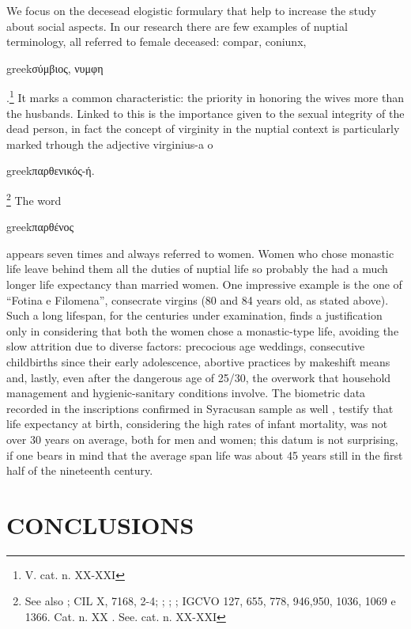 \documentclass[amsthm,ebook]{saparticle}
\begin{document}
We focus on the decesead elogistic formulary that help to increase the study about social aspects. In our research there are few examples of nuptial terminology, all referred to female deceased: compar, coniunx, 
\begin{otherlanguage*}{greek}σύμβιος, νυμφη\end{otherlanguage*}
.\footnote{V. cat. n. XX-XXI} It marks a common characteristic: the priority in honoring the wives more than the husbands. Linked to this is the importance given to the sexual integrity of the dead person, in fact the concept of virginity in the nuptial context is particularly marked trhough the adjective virginius-a o \begin{otherlanguage*}{greek}παρθενικός-ή.\end{otherlanguage*}
\footnote{See also \citet[129-130]{SGARLATA1991} \citet[493]{CARINI 1887}; CIL X, 7168, 2-4; \citet[5, 22, 44]{ORSI1893}; \citet[6, 7]{FUHRER1897}; \citep[21/29, 38, 39, 43, 45, 48, 58, 60, 69]{FERRUA1983}; IGCVO 127, 655, 778, 946,950, 1036, 1069 e 1366. Cat. n. XX \citep[214]{ORSI1896}. See. cat. n. XX-XXI} The word \begin{otherlanguage*}{greek}παρθένος\end{otherlanguage*} 
appears seven times and always referred to women. Women who chose monastic life leave behind them all the duties of nuptial life so probably the had a much longer life expectancy than married women. One impressive example is the one of ``Fotina e Filomena'', consecrate virgins (80 and 84 years old, as stated above). Such a long lifespan, for the centuries under examination, finds a justification only in considering that both the women chose a monastic-type life, avoiding the slow attrition due to diverse factors: precocious age weddings, consecutive childbirths since their early adolescence, abortive practices by makeshift means and, lastly, even after the dangerous age of 25/30, the overwork that household management and hygienic-sanitary conditions involve. The biometric data recorded in the inscriptions confirmed in Syracusan sample as well \citep{SGARLATA1991}, testify that life expectancy at birth, considering the high rates of infant mortality, was not over 30 years on average, both for men and women; this datum is not surprising, if one bears in mind that the average span life was about 45 years still in the first half of the nineteenth century.



\section{CONCLUSIONS}
\end{document}
